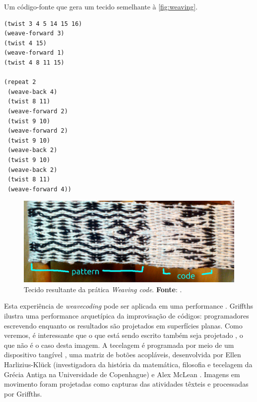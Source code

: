 \begin{example}{Um código-fonte que gera um tecido semelhante à \autoref{fig:weaving}.}
\label{ex:weaving}
\begin{verbatim}
(twist 3 4 5 14 15 16)
(weave-forward 3)
(twist 4 15)
(weave-forward 1)
(twist 4 8 11 15)

(repeat 2
 (weave-back 4)
 (twist 8 11)
 (weave-forward 2)
 (twist 9 10)
 (weave-forward 2)
 (twist 9 10)
 (weave-back 2)
 (twist 9 10)
 (weave-back 2)
 (twist 8 11)
 (weave-forward 4))
\end{verbatim}
\end{example}

\begin{figure}[!h]
    \centering
    \includegraphics[scale=0.31]{imagens/weaving.jpg}
    \caption{Tecido resultante da prática \emph{Weaving code}. \textbf{Fonte}: .}
  \label{fig:weaving}
\end{figure}

Esta experiência de \emph{weavecoding} pode ser aplicada em uma performance . Griffths ilustra uma performance arquetípica da improvisação de códigos: programadores escrevendo enquanto os resultados são projetados em superfícies planas. Como veremos, é interessante que o que está sendo escrito também seja projetado \cite[p.~129]{McLean2011}, o que não é o caso desta imagem. A tecelagem é programada por meio de um dispositivo tangível , uma matriz de botões acopláveis, desenvolvida por Ellen Harlizius-Klück (investigadora da história da matemática, filosofia e tecelagem da Grécia Antiga na Universidade de Copenhague) e Alex McLean . Imagens em movimento foram projetadas como capturas das atividades têxteis e processadas por Griffths. 

